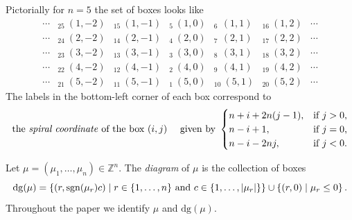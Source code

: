 \documentclass[11pt]{article}
\theoremstyle{plain}
\theoremstyle{definition}
\theoremstyle{remark}
\numberwithin{equation}{section}
\newcommand{\dg}{\mathrm{dg}}
\newcommand{\sgn}{\mathrm{sgn}}
\def\ZZ{\mathbb{Z}}
\newcounter{r}
\newcounter{s}
\begin{document}
Pictorially for $n=5$ the set of boxes looks like
\[
\begin{array}{ccc|c|ccc}
\cdots
&\boxed{{}_{25}\ (1,-2)} 
&\boxed{{}_{15}\ (1,-1)} 
&\boxed{{}_{5}\ (1,0)} 
&\boxed{{}_{6\ }\ (1,1)} 
&\boxed{{}_{16}\ (1,2)} 
&\cdots 
\\
\cdots
&\boxed{{}_{24}\ (2,-2)} 
&\boxed{{}_{14}\ (2,-1)} 
&\boxed{{}_{4}\ (2,0)} 
&\boxed{{}_{7\ }\ (2,1)} 
&\boxed{{}_{17}\ (2,2)} 
&\cdots 
\\
\cdots
&\boxed{{}_{23}\ (3,-2)} 
&\boxed{{}_{13}\ (3,-1)} 
&\boxed{{}_{3}\ (3,0)} 
&\boxed{{}_{8\ }\ (3,1)} 
&\boxed{{}_{18}\ (3,2)} 
&\cdots 
\\
\cdots
&\boxed{{}_{22}\ (4,-2)} 
&\boxed{{}_{12}\ (4,-1)} 
&\boxed{{}_{2}\ (4,0)} 
&\boxed{{}_{9\ }\ (4,1)} 
&\boxed{{}_{19}\ (4,2)} 
&\cdots 
\\
\cdots
&\boxed{{}_{21}\ (5,-2)} 
&\boxed{{}_{11}\ (5,-1)} 
&\boxed{{}_{1}\ (5,0)} 
&\boxed{{}_{10}\ (5,1)} 
&\boxed{{}_{20}\ (5,2)} 
&\cdots 
\end{array}
\]
The labels in the bottom-left corner of each box correspond to
\begin{equation}
\hbox{the \emph{spiral coordinate} of the box $(i,j)$ \quad given by}\ 
\begin{cases}
n+i+2n(j-1), &\hbox{if $j>0$,} \\
n-i+1, &\hbox{if $j=0$,} \\
n-i-2nj, &\hbox{if $j<0$.}
\end{cases}
\label{spiral}
\end{equation}

Let $\mu=(\mu_1, \ldots, \mu_n)\in \ZZ^n$.  
The \emph{diagram} of $\mu$ is the collection of boxes
$$
\dg(\mu) = \left\{(r, \sgn(\mu_{r})c) \;|\; \hbox{$r\in \{1, \ldots, n\}$ and $c\in \{1, \ldots, \vert \mu_r\vert \}$}\}
\cup 
\{(r, 0) \;|\; \mu_{r} \le 0 \right\}.
$$
Throughout the paper we identify $\mu$ and $\dg(\mu)$.
\end{document}
